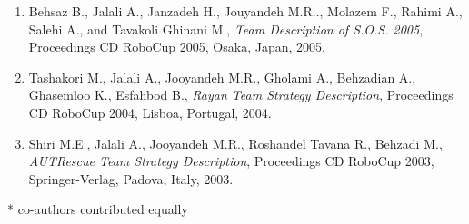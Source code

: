 \documentclass[11pt,a4paper,sans]{moderncv} %
\begin{document}
\begin{enumerate}
\item Behsaz B., Jalali A., Janzadeh H., Jouyandeh M.R.., Molazem F., Rahimi A., Salehi A., and Tavakoli Ghinani M., \emph{Team Description of S.O.S. 2005}, Proceedings CD RoboCup 2005, Osaka, Japan, 2005.
  
\item Tashakori M., Jalali A., Jooyandeh M.R., Gholami A., Behzadian A., Ghasemloo K., Esfahbod B., \emph{Rayan Team Strategy Description}, Proceedings CD RoboCup 2004, Lisboa, Portugal, 2004.
  
\item Shiri M.E., Jalali A., Jooyandeh M.R., Roshandel Tavana R., Behzadi M., \emph{AUTRescue Team Strategy Description}, Proceedings CD RoboCup 2003, Springer-Verlag, Padova, Italy, 2003. 
\end{enumerate}

\vspace{.5cm}
\small{* co-authors contributed equally}










\end{document}
